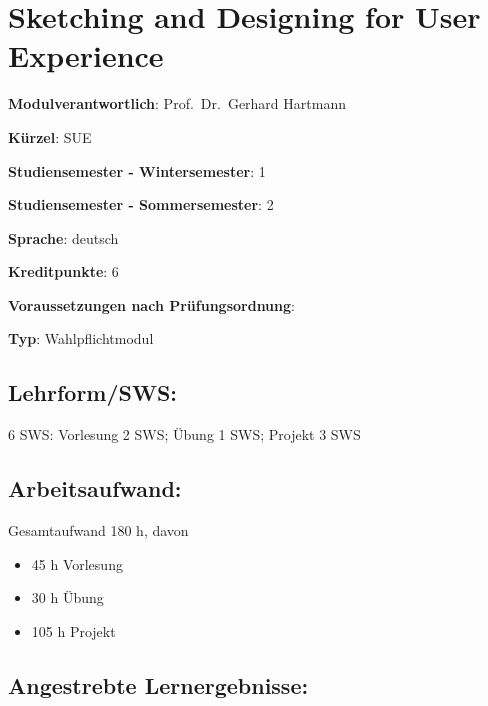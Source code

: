 \chapter{Sketching and Designing for User
Experience}\label{sketching-and-designing-for-user-experience}

\begin{modulHead}
\textbf{Modulverantwortlich}: Prof.~Dr.~Gerhard
Hartmann
\end{modulHead}
\begin{modulHead}
\textbf{Kürzel}:
SUE
\end{modulHead}
\begin{modulHead}
\textbf{Studiensemester -
Wintersemester}:
1
\end{modulHead}
\begin{modulHead}
\textbf{Studiensemester -
Sommersemester}: 2
\end{modulHead}
\begin{modulHead}
\textbf{Sprache}:
deutsch
\end{modulHead}
\begin{modulHead}
\textbf{Kreditpunkte}:
6
\end{modulHead}
\begin{modulHead}
\textbf{Voraussetzungen nach
Prüfungsordnung}: 
\end{modulHead}
\begin{modulHead}
\textbf{Typ}:
Wahlpflichtmodul
\end{modulHead}


\section*{Lehrform/SWS:}\label{lehrformsws-8}

6 SWS: Vorlesung 2 SWS; Übung 1 SWS; Projekt 3 SWS

\section*{Arbeitsaufwand:}\label{arbeitsaufwand-13}

Gesamtaufwand 180 h, davon

\begin{itemize}
\tightlist
\item
  45 h Vorlesung
\item
  30 h Übung
\item
  105 h Projekt
\end{itemize}

\section*{Angestrebte
Lernergebnisse:}\label{angestrebte-lernergebnisse-7}

